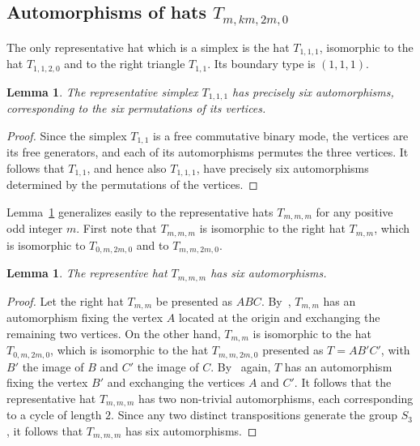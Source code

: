 \documentclass[12pt]{amsart}
\theoremstyle{plain}
\newtheorem{lemma}[theorem]{Lemma}
\theoremstyle{definition}
\numberwithin{equation}{section}
\begin{document}
\subsection{Automorphisms of hats $T_{m,km,2m,0}$}\label{Sss: autmkm2mhats}


The only representative hat which is a simplex is the hat $T_{1,1,1}$, isomorphic to the hat
$T_{1,1,2,0}$ and to the right triangle $T_{1,1}$. Its boundary type is $(1,1,1)$.



\begin{lemma}\label{L:autssimplex}
The representative simplex $T_{1,1,1}$ has precisely six automorphisms, corresponding to the six permutations of its vertices.
\end{lemma}

\begin{proof}
Since the simplex $T_{1,1}$ is a free commutative binary mode, the vertices are its free
generators, and each of its automorphisms permutes the three vertices. It
follows that $T_{1,1}$, and hence also $T_{1,1,1}$, have precisely six automorphisms determined
by the permutations of the vertices.
\end{proof}

Lemma~\ref{L:autssimplex} generalizes easily to the representative hats $T_{m,m,m}$ for any
positive odd integer $m$. First note that $T_{m,m,m}$ is isomorphic
to the right hat $T_{m,m}$, which is isomorphic to $T_{0,m,2m,0}$ and to $T_{m,m,2m,0}$.




\begin{lemma}\label{L:mmm}
The representive hat $T_{m,m,m}$ has six automorphisms.
\end{lemma}

\begin{proof}
 Let the right hat $T_{m,m}$ be presented as $ABC$.
By~\cite[Lemma~3.2]{MR25}, $T_{m,m}$ has an automorphism fixing the vertex $A$ located at the
origin and exchanging the remaining two vertices. On the other hand, $T_{m,m}$ is isomorphic to the hat $T_{0,m,2m,0}$, which is isomorphic to the hat $T_{m,m,2m,0}$ presented as $T =
AB'C'$, with $B'$ the image of $B$ and $C'$ the image of $C$. By~\cite[Lemma~3.2]{MR25} again, $T$ has an automorphism fixing the vertex $B'$ and exchanging the vertices $A$ and $C'$.
It follows that the representative hat $T_{m,m,m}$ has two non-trivial automorphisms, each
corresponding to a cycle of length $2$. Since any two distinct transpositions generate the group $S_3$,
 it follows that $T_{m,m,m}$ has six automorphisms.
\end{proof}
\end{document}
